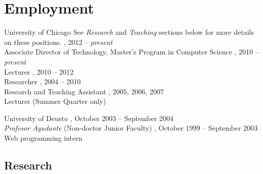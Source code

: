 \documentclass{resume}
\begin{document}
\section*{\hspace{-1cm}Employment}
\begin{category}{University of Chicago}
\citemnobullet{} See \emph{Research} and \emph{Teaching} sections below for more details on these positions.
, 2012 -- \emph{present}\\
Associate Director of Technology, Master's Program in Computer Science
, 2010 -- \emph{present}\\
Lecturer
, 2010 -- 2012\\
Researcher
, 2004 -- 2010\\
Research and Teaching Assistant
, 2005, 2006, 2007\\
Lecturer (Summer Quarter only)
\end{category}
\begin{category}{University of Deusto}
, October 2003 -- September 2004\\
\emph{Profesor Ayudante} (Non-doctor Junior Faculty)
, October 1999 -- September 2003\\
Web programming intern
\end{category}

\pagebreak





\begin{center}
\section*{\huge Research}
\vspace{2ex}
\end{center}
\end{document}
